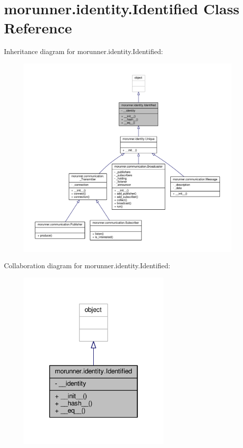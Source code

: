 \hypertarget{classmorunner_1_1identity_1_1Identified}{}\section{morunner.\+identity.\+Identified Class Reference}
\label{classmorunner_1_1identity_1_1Identified}


Inheritance diagram for morunner.\+identity.\+Identified\+:
\nopagebreak
\begin{figure}[H]
\begin{center}
\leavevmode
\includegraphics[width=350pt]{classmorunner_1_1identity_1_1Identified__inherit__graph}
\end{center}
\end{figure}


Collaboration diagram for morunner.\+identity.\+Identified\+:
\nopagebreak
\begin{figure}[H]
\begin{center}
\leavevmode
\includegraphics[width=214pt]{classmorunner_1_1identity_1_1Identified__coll__graph}
\end{center}
\end{figure}
